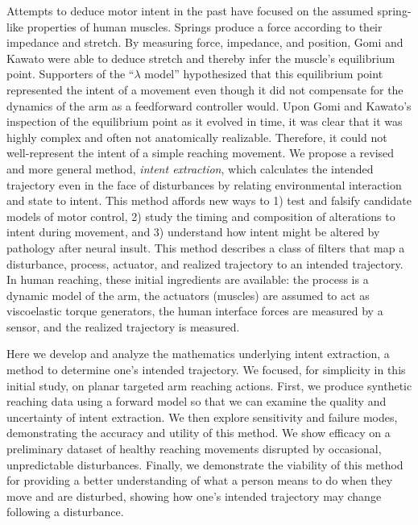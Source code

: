 Attempts to deduce motor intent in the past have focused on the assumed spring-like properties of human muscles. Springs produce a force according to their impedance and stretch. By measuring force, impedance, and position, Gomi and Kawato\cite{gomi1997human} were able to deduce stretch and thereby infer the muscle's equilibrium point. Supporters of the ``$\lambda$ model''\cite{feldman1995origin} hypothesized that this equilibrium point represented the intent of a movement even though it did not compensate for the dynamics of the arm as a feedforward controller would. Upon Gomi and Kawato's inspection of the equilibrium point as it evolved in time, it was clear that it was highly complex and often not anatomically realizable. Therefore, it could not well-represent the intent of a simple reaching movement. We propose a revised and more general method, \textit{intent extraction}, which calculates the intended trajectory even in the face of disturbances by relating environmental interaction and state to intent. This method affords new ways to 1) test and falsify candidate models of motor control, 2) study the timing and composition of alterations to intent during movement, and 3) understand how intent might be altered by pathology after neural insult. This method describes a class of filters that map a disturbance, process, actuator, and realized trajectory to an intended trajectory. In human reaching, these initial ingredients are available: the process is a dynamic model of the arm, the actuators (muscles) are assumed to act as viscoelastic torque generators, the human interface forces are measured by a sensor, and the realized trajectory is measured.

Here we develop and analyze the mathematics underlying intent extraction, a method to determine one's intended trajectory. We focused, for simplicity in this initial study, on planar targeted arm reaching actions. First, we produce synthetic reaching data using a forward model so that we can examine the quality and uncertainty of intent extraction. We then explore sensitivity and failure modes, demonstrating the accuracy and utility of this method. We show efficacy on a preliminary dataset of healthy reaching movements disrupted by occasional, unpredictable disturbances. Finally, we demonstrate the viability of this method for providing a better understanding of what a person means to do when they move and are disturbed, showing how one's intended trajectory may change following a disturbance.



